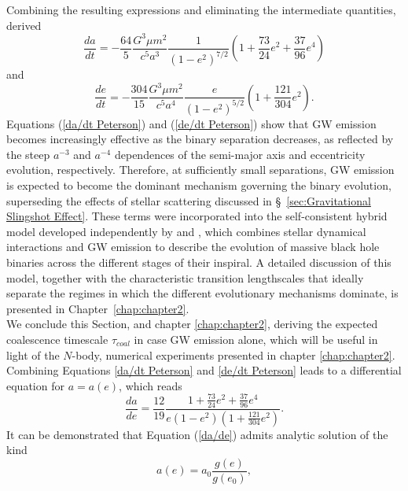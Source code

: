 \documentclass[12pt,twoside,openany]{book}
\begin{document}
Combining the resulting expressions and eliminating the intermediate quantities, \textcite{Peters_1963} derived
\begin{equation}\label{da/dt Peterson}
    \frac{da}{dt} = -\frac{64}{5} \frac{G^3 \mu m^2}{c^5 a^3} \frac{1}{(1 - e^2)^{7/2}} \left( 1 + \frac{73}{24}e^2 + \frac{37}{96}e^4 \right)
\end{equation}
and
\begin{equation}\label{de/dt Peterson}
    \frac{de}{dt} = -\frac{304}{15} \frac{G^3 \mu m^2}{c^5 a^4}  \frac{e}{(1 - e^2)^{5/2}} \left( 1 + \frac{121}{304}e^2 \right).
\end{equation}
Equations (\ref{da/dt Peterson}) and (\ref{de/dt Peterson}) show that GW emission becomes increasingly effective as the binary separation decreases, as reflected by the steep $a^{-3}$ and $a^{-4}$ dependences of the semi-major axis and eccentricity evolution, respectively. Therefore, at sufficiently small separations, GW emission is expected to become the dominant mechanism governing the binary evolution, superseding the effects of stellar scattering discussed in \S~\ref{sec:Gravitational Slingshot Effect}. These terms were incorporated into the self-consistent hybrid model developed independently by \textcite{Quinlan_1996} and \textcite{Sesana_2010}, which combines stellar dynamical interactions and GW emission to describe the evolution of massive black hole binaries across the different stages of their inspiral. A detailed discussion of this model, together with the characteristic transition lengthscales that ideally separate the regimes in which the different evolutionary mechanisms dominate, is presented in Chapter~\ref{chap:chapter2}.\\We conclude this Section, and chapter \ref{chap:chapter2}, deriving the expected coalescence timescale $\tau_{coal} $ in case GW emission alone, which will be useful in light of the $N$-body, numerical experiments presented in chapter \ref{chap:chapter2}.\\Combining Equations \ref{da/dt Peterson} and \ref{de/dt Peterson} leads to a differential equation for $a=a(e)$, which reads
\begin{equation}
\label{da/de}
\frac{da}{de}
=
\frac{12}{19}
\frac{1+\frac{73}{24}e^2+\frac{37}{96}e^4}
{e(1-e^2)\left(1+\frac{121}{304}e^2\right)}.
\end{equation}
It can be demonstrated that Equation (\ref{da/de}) admits analytic solution of the kind
\begin{equation}
\label{a(e)}
a(e)=a_0\frac{g(e)}{g(e_0)},
\end{equation}
\end{document}
